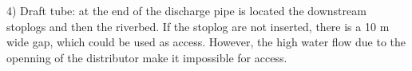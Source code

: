 


4) Draft tube: at the end of the discharge pipe is located the downstream
stoplogs and then the riverbed. If the stoplog are not inserted, there is a 10 m wide gap, which
could be used as access. However, the high water flow due to the
openning of the distributor make it impossible for access. %



